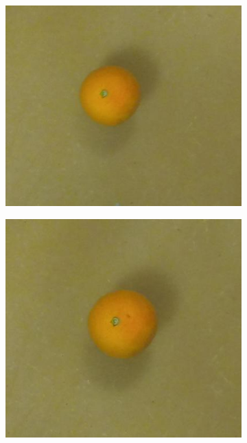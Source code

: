 \documentclass {udthesis}
\begin{document}
\begin{figure}
  \centering
  \begin{subfigure}[]{0.12\textwidth}
      \includegraphics[width=\textwidth]{orange4_obj_11/orange4_011_32}
      \caption{}
  \end{subfigure}
  \begin{subfigure}[]{0.12\textwidth}
      \includegraphics[width=\textwidth]{orange4_obj_11/orange4_011_30}

\end{subfigure}
\end{figure}
\end{document}
